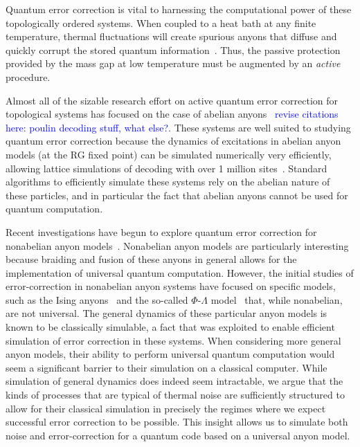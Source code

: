 \documentclass[aps, prl, letterpaper, twocolumn, superscriptaddress, notitlepage, 10pt]{revtex4-1}
\newcommand{\cggb}[1]{\textcolor{blue}{#1}}
\begin{document}
Quantum error correction is vital to harnessing the computational power of these topologically 
ordered systems. When coupled to a heat bath at any finite temperature, thermal fluctuations 
will create spurious anyons that diffuse and quickly corrupt the stored quantum 
information~\cite{Pastawski2010}. Thus, the passive protection provided by the mass gap 
at low temperature must be augmented by an \emph{active} procedure. 

Almost all of the sizable research effort on active quantum error correction for topological 
systems has focused on the case of abelian anyons~\cite{Terhal2014} \cggb{revise citations here: poulin decoding stuff, what else?}. These systems are 
well suited to studying quantum error correction because the dynamics of excitations in 
abelian anyon models (at the RG fixed point) can be simulated numerically very efficiently, allowing lattice 
simulations of decoding with over 1 million sites~\cite{Duclos-Cianci2010}. Standard algorithms to efficiently simulate these systems rely on the abelian nature of these particles, and in particular the fact that abelian anyons cannot be used for quantum computation. 

Recent investigations have begun to explore quantum error correction for nonabelian anyon 
models~\cite{Brell2013, Wootton2013, Hutter2014}. Nonabelian anyon models are particularly interesting 
because braiding and fusion of these anyons in general allows for the implementation of universal quantum 
computation. However, the initial studies of error-correction in nonabelian anyon systems have focused on specific models, such as the Ising 
anyons~\cite{Brell2013} and the so-called $\Phi$-$\Lambda$ 
model~\cite{Wootton2013, Hutter2014} that, while nonabelian, are not universal. The general dynamics of these particular anyon models is known to be classically simulable, a fact
that was exploited to enable efficient simulation of error correction in these systems. When considering more general anyon models, their ability to perform universal quantum computation would seem a significant barrier to their simulation on a classical computer. While simulation of general dynamics does indeed seem intractable, we argue that the kinds of processes that are typical of thermal noise are sufficiently structured to allow for their classical simulation in precisely the regimes where we expect successful error correction to be possible. This insight allows us to simulate both noise and error-correction for a quantum code based on a universal anyon model.
\end{document}
